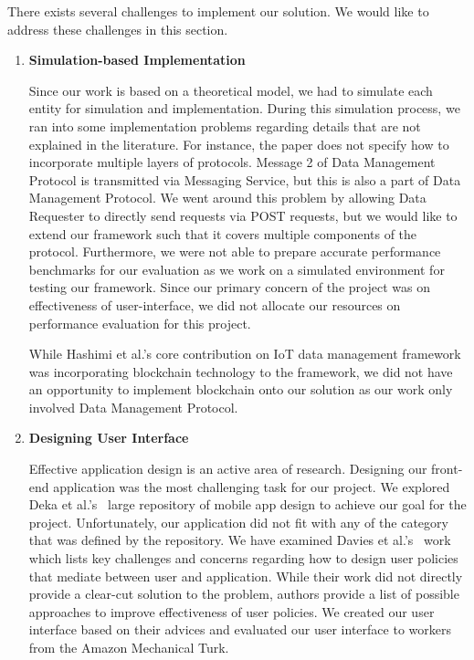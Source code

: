 There exists several challenges to implement our solution. We would like to address these challenges in this section. 

\begin{enumerate}
\item \textbf{Simulation-based Implementation}

Since our work is based on a theoretical model, we had to simulate each entity for simulation and implementation. During this simulation process, we ran into some implementation problems regarding details that are not explained in the literature. For instance, the paper does not specify how to incorporate multiple layers of protocols. Message 2 of Data Management Protocol is transmitted via Messaging Service, but this is also a part of Data Management Protocol. We went around this problem by allowing Data Requester to directly send requests via POST requests, but we would like to extend our framework such that it covers multiple components of the protocol. Furthermore, we were not able to prepare accurate performance benchmarks for our evaluation as we work on a simulated environment for testing our framework. Since our primary concern of the project was on effectiveness of user-interface, we did not allocate our resources on performance evaluation for this project.

While Hashimi et al.'s core contribution on IoT data management framework was incorporating blockchain technology to the framework, we did not have an opportunity to implement blockchain onto our solution as our work only involved Data Management Protocol.


\item \textbf{Designing User Interface}

Effective application design is an active area of research. Designing our front-end application was the most challenging task for our project. We explored Deka et al.'s~\cite{rico} large repository of mobile app design to achieve our goal for the project. Unfortunately, our application did not fit with any of the category that was defined by the repository. We have examined Davies et al.'s~\cite{davies} work which lists key challenges and concerns regarding how to design user policies that mediate between user and application. While their work did not directly provide a clear-cut solution to the problem, authors provide a list of possible approaches to improve effectiveness of user policies. We created our user interface based on their advices and evaluated our user interface to workers from the Amazon Mechanical Turk.


\end{enumerate}
